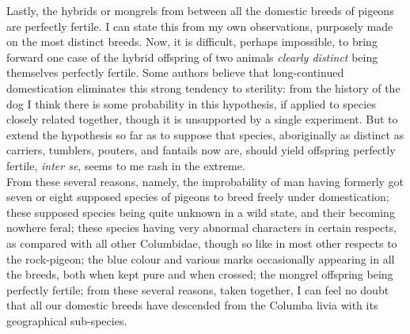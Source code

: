 \indent Lastly, the hybrids or mongrels from between all the domestic breeds of pigeons are perfectly fertile. I can state this from my own observations, purposely made on the most distinct breeds. Now, it is difficult, perhaps impossible, to bring forward one case of the hybrid offspring of two animals \emph{clearly distinct} being themselves perfectly fertile. Some authors believe that long-continued domestication eliminates this strong tendency to sterility: from the history of the dog I think there is some probability in this hypothesis, if applied to species closely related together, though it is unsupported by a single experiment. But to extend the hypothesis so far as to suppose that species, aboriginally as distinct as carriers, tumblers, pouters, and fantails now are, should yield offspring perfectly fertile, \emph{inter se}, seems to me rash in the extreme.   \\
\indent From these several reasons, namely, the improbability of man having formerly got seven or eight supposed species of pigeons to breed freely under domestication; these supposed species being quite unknown in a wild state, and their becoming nowhere feral; these species having very abnormal characters in certain respects, as compared with all other Columbidae, though so like in most other respects to the rock-pigeon; the blue colour and various marks occasionally appearing in all the breeds, both when kept pure and when crossed; the mongrel offspring being perfectly fertile; from these several reasons, taken together, I can feel no doubt that all our domestic breeds have descended from the Columba livia with its geographical sub-species.   \\

